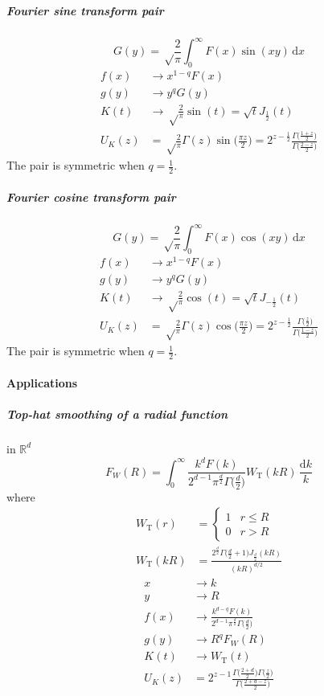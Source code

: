 \documentclass{article}
\renewcommand{\d}{\mathrm{d}}
\newcommand{\Mellin}{U}
\newcommand{\Tophat}{\textrm{T}}
\begin{document}
\subparagraph{Fourier sine transform pair}
\begin{equation}
    G(y) = \sqrt\frac2\pi \int_0^\infty F(x) \sin(xy) \,\d x
\end{equation}
\begin{align}
    f(x) &\to x^{1-q} F(x)  \\
    g(y) &\to y^q G(y)  \\
    K(t) &\to \sqrt\frac2\pi \sin(t) = \sqrt t J_\frac12(t)  \\
    \Mellin_K(z) &= \sqrt\frac2\pi \Gamma(z) \sin\bigl(\frac{\pi z}2\bigr)
    = 2^{z-\frac12} \frac{\Gamma\bigl(\frac{1+z}2\bigr)}{\Gamma\bigl(\frac{2-z}2\bigr)}
\end{align}
The pair is symmetric when $q=\frac12$.


\subparagraph{Fourier cosine transform pair}
\begin{equation}
    G(y) = \sqrt\frac2\pi \int_0^\infty F(x) \cos(xy) \,\d x
\end{equation}
\begin{align}
    f(x) &\to x^{1-q} F(x)  \\
    g(y) &\to y^q G(y)  \\
    K(t) &\to \sqrt\frac2\pi \cos(t) = \sqrt t J_{-\frac12}(t)  \\
    \Mellin_K(z) &= \sqrt\frac2\pi \Gamma(z) \cos\bigl(\frac{\pi z}2\bigr)
    = 2^{z-\frac12} \frac{\Gamma\bigl(\frac{z}2\bigr)}{\Gamma\bigl(\frac{1-z}2\bigr)}
\end{align}
The pair is symmetric when $q=\frac12$.


\paragraph{Applications}


\subparagraph{Top-hat smoothing of a radial function}
in $\mathbb{R}^d$
\begin{equation}
    F_W(R) = \int_0^\infty \frac{k^d F(k)}{2^{d-1}\pi^\frac{d}2\Gamma\bigl(\frac{d}2\bigr)}
                    W_\Tophat(kR) \,\frac{\d k}k
\end{equation}
where
\begin{align}
    W_\Tophat(r) &= \begin{cases}
        1 & r\leq R \\
        0 & r > R
    \end{cases} \\
    W_\Tophat(kR) &= \frac{2^\frac{d}2\Gamma\bigl(\frac{d}2+1\bigr)J_\frac{d}2(kR)}{(kR)^{d/2}}
\end{align}
\begin{align}
    x &\to k  \\
    y &\to R  \\
    f(x) &\to \frac{k^{d-q}F(k)}{2^{d-1}\pi^\frac{d}2\Gamma\bigl(\frac{d}2\bigr)}  \\
    g(y) &\to R^q F_W(R)  \\
    K(t) &\to W_\Tophat(t)  \\
    \Mellin_K(z) &= 2^{z-1} \frac{\Gamma\bigl(\frac{2+d}2\bigr)\Gamma\bigl(\frac{z}2\bigr)}
                        {\Gamma\bigl(\frac{2+d-z}2\bigr)}
\end{align}
\end{document}
